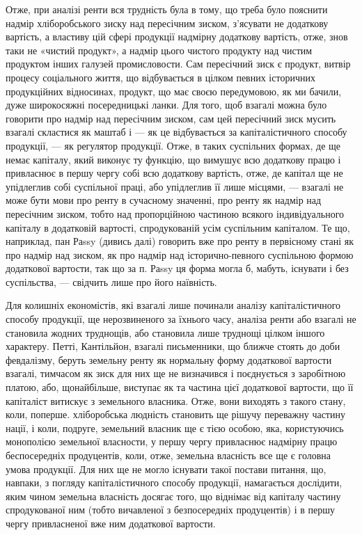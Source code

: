 Отже, при аналізі ренти вся трудність була в тому, що треба було
пояснити надмір хліборобського зиску над пересічним зиском, з’ясувати не додаткову
вартість, а властиву цій сфері продукції надмірну додаткову вартість,
отже, знов таки не «чистий продукт», а надмір цього чистого продукту над
чистим продуктом інших галузей промисловости. Сам пересічний зиск є продукт,
витвір процесу соціального життя, що відбувається в цілком певних історичних
продукційних відносинах, продукт, що має своєю передумовою, як ми
бачили, дуже широкосяжні посередницькі ланки. Для того, щоб взагалі можна було
говорити про надмір над пересічним зиском, сам цей пересічний зиск мусить
взагалі скластися як маштаб і — як це відбувається за капіталістичного способу
продукції, — як регулятор продукції. Отже, в таких суспільних формах, де ще
немає капіталу, який виконує ту функцію, що вимушує всю додаткову працю
і привласнює в першу чергу собі всю додаткову вартість, отже, де капітал ще
не упідлеглив собі суспільної праці, або упідлеглив її лише місцями, — взагалі
не може бути мови про ренту в сучасному значенні, про ренту як надмір
над пересічним зиском, тобто над пропорційною частиною всякого індивідуального
капіталу в додатковій вартості, спродукованій усім суспільним капіталом. Те
що, наприклад, пан Раssy (дивись далі) говорить вже про ренту в первісному стані
як про надмір над зиском, як про надмір над історично-певного суспільною
формою додаткової вартости, так що за п. Раssy ця форма могла б, мабуть,
існувати і без суспільства, — свідчить лише про його наївність.

Для колишніх економістів, які взагалі лише починали аналізу капіталістичного
способу продукції, ще нерозвиненого за їхнього часу, аналіза ренти
або взагалі не становила жодних труднощів, або становила лише труднощі цілком
іншого характеру. Петті, Кантільйон, взагалі письменники, що ближче стоять
до доби февдалізму, беруть земельну ренту як нормальну форму додаткової
вартости взагалі, тимчасом як зиск для них ще не визначився і поєднується
з заробітною платою, або, щонайбільше, виступає як та частина цієї
додаткової вартости, що її капіталіст витискує з земельного власника. Отже, вони
виходять з такого стану, коли, поперше. хліборобська людність становить ще рішучу
переважну частину нації, і коли, подруге, земельний власник ще є тією
особою, яка, користуючись монополією земельної власности, у першу чергу привласнює
надмірну працю беспосередніх продуцентів, коли, отже, земельна власність
все ще є головна умова продукції. Для них ще не могло існувати такої
постави питання, що, навпаки, з погляду капіталістичного способу продукції,
намагається дослідити, яким чином земельна власність досягає того, що
віднімає від капіталу частину спродукованої ним (тобто вичавленої з безпосередніх
продуцентів) і в першу чергу привласненої вже ним додаткової вартости.

